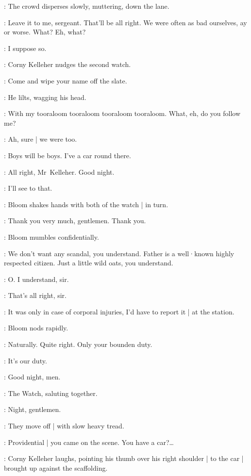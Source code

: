 :
The crowd disperses slowly,
muttering,
down the lane.

\Corny:
Leave it to me,
sergeant.
That'll be all right.
We were often as bad ourselves,
ay or worse.
What?
Eh,
what?

\FirstWatch:
I suppose so.

:
Corny Kelleher nudges the second watch.

\Corny:
Come and wipe your name off the slate.

:
He lilts,
wagging his head.

\Corny:
With my tooraloom tooraloom tooraloom tooraloom.
What,
eh,
do you follow me?

\SecondWatch:
Ah,
sure |
we were too.

\Corny:
Boys will be boys.
I've a car round there.

\SecondWatch:
All right,
Mr~Kelleher.
Good night.

\Corny:
I'll see to that.

:
Bloom shakes hands with both of the watch |
in turn.

\Bloom:
Thank you very much,
gentlemen.
Thank you.

:
Bloom mumbles confidentially.

\Bloom:
We don't want any scandal,
you understand.
%
Father is a well·known highly respected citizen.
Just a little wild oats,
you understand.

\FirstWatch:
O.
I understand,
sir.

\SecondWatch:
That's all right,
sir.

\FirstWatch:
It was only in case of corporal injuries,
I'd have to report it |
at the station.

:
Bloom nods rapidly.

\Bloom:
Naturally.
Quite right.
Only your bounden duty.

\SecondWatch:
It's our duty.

\Corny:
Good night,
men.

:
The Watch,
saluting together.

\Watch:
Night,
gentlemen.

:
They move off |
with slow heavy tread.

\Bloom:
Providential |
you came on the scene.
You have a car?…

:
Corny Kelleher laughs,
pointing his thumb over his right shoulder |
%
to the car |
brought up against the scaffolding.

